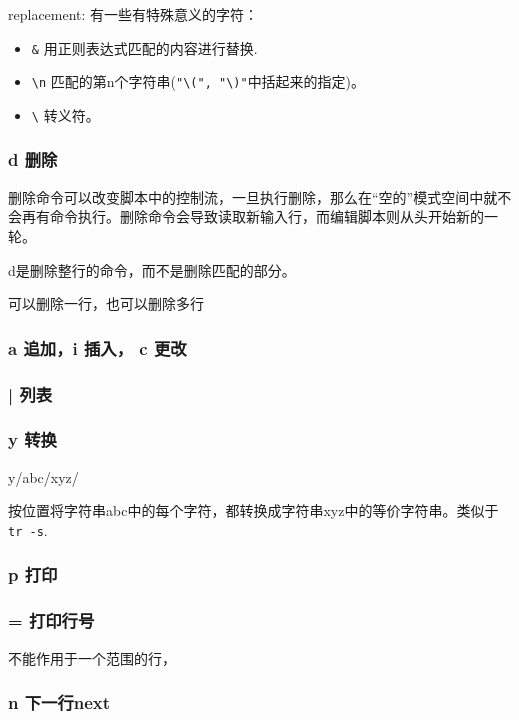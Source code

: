 replacement:
有一些有特殊意义的字符：
\begin{itemize}
\item \lstinline$&$ 用正则表达式匹配的内容进行替换.
\item \lstinline$\n$ 匹配的第n个字符串(\lstinline$"\(", "\)"$中括起来的指定)。
\item \lstinline$\$ 转义符。
\end{itemize}


\subsubsection{d 删除}

删除命令可以改变脚本中的控制流，一旦执行删除，那么在“空的”模式空间中就不会再有命令执行。删除命令会导致读取新输入行，而编辑脚本则从头开始新的一轮。

d是删除整行的命令，而不是删除匹配的部分。

可以删除一行，也可以删除多行

\subsubsection{a 追加，i 插入， c 更改}



\subsubsection{| 列表}

\subsubsection{y 转换}

\begin{Command-Line}
[address]y/abc/xyz/
\end{Command-Line}

按位置将字符串abc中的每个字符，都转换成字符串xyz中的等价字符串。类似于\lstinline$tr -s$.

\subsubsection{p 打印}

\subsubsection{= 打印行号}

不能作用于一个范围的行，

\subsubsection{n 下一行next}


